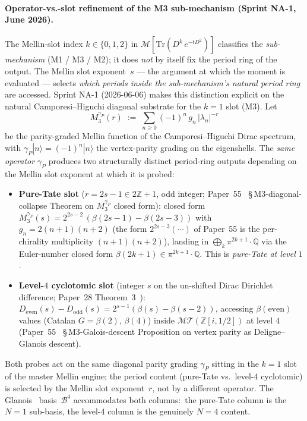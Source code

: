 \documentclass[aps,pra,twocolumn,superscriptaddress,longbibliography]{revtex4-2}
\begin{document}
\paragraph{Operator-vs.-slot refinement of the M3 sub-mechanism
(Sprint NA-1, June 2026).}
The Mellin-slot index $k \in \{0, 1, 2\}$ in
$\mathcal{M}[\mathrm{Tr}(D^k\, e^{-tD^2})]$ classifies the
\emph{sub-mechanism} (M1 / M3 / M2); it does \emph{not} by itself fix
the period ring of the output.  The Mellin slot exponent~$s$ --- the
argument at which the moment is evaluated --- selects \emph{which
periods inside the sub-mechanism's natural period ring} are accessed.
Sprint NA-1 (2026-06-06) makes this distinction explicit on the natural
Camporesi--Higuchi diagonal substrate for the $k = 1$ slot (M3).
Let
\begin{equation}
\label{eq:m3_gammaP_slot}
M_3^{\gamma_P}(r)
   \;:=\; \sum_{n \ge 0} (-1)^n\, g_n\, |\lambda_n|^{-r}
\end{equation}
be the parity-graded Mellin function of the Camporesi--Higuchi Dirac
spectrum, with $\gamma_P|n\rangle = (-1)^n |n\rangle$ the vertex-parity
grading on the eigenshells.  The \emph{same operator} $\gamma_P$
produces two structurally distinct period-ring outputs depending on
the Mellin slot exponent at which it is probed:
\begin{itemize}
  \item \textbf{Pure-Tate slot} ($r = 2s - 1 \in 2\mathbb{Z} + 1$, odd
    integer; Paper~55~\cite{loutey_paper55}
    \S\,M3-diagonal-collapse Theorem on
    $M_3^{\gamma_P}$ closed form):
    closed form
    $M_3^{\gamma_P}(s) = 2^{2s - 2}\,(\beta(2s - 1) - \beta(2s - 3))$
    with $g_n = 2(n+1)(n+2)$ (the form $2^{2s-3}(\cdots)$ of Paper~55 is
    the per-chirality multiplicity $(n+1)(n+2)$),
    landing in $\bigoplus_k \pi^{2k+1}\cdot\mathbb{Q}$ via the
    Euler-number closed form
    $\beta(2k + 1) \in \pi^{2k + 1}\cdot\mathbb{Q}$.  This is
    \emph{pure-Tate at level $1$}.
  \item \textbf{Level-$4$ cyclotomic slot} (integer $s$ on the
    un-shifted Dirac Dirichlet difference; Paper~28
    Theorem~3~\cite{loutey_paper28}):
    $D_{\mathrm{even}}(s) - D_{\mathrm{odd}}(s)
       = 2^{s-1}(\beta(s) - \beta(s-2))$,
    accessing $\beta(\mathrm{even})$ values
    (Catalan $G = \beta(2)$, $\beta(4)$) inside
    $\mathcal{MT}(\mathbb{Z}[i, 1/2])$ at level $4$
    (Paper~55~\cite{loutey_paper55} \S\,M3-Galois-descent
    Proposition on vertex parity as
    Deligne--Glanois descent).
\end{itemize}
Both probes act on the same diagonal parity grading $\gamma_P$
sitting in the $k = 1$ slot of the master Mellin engine; the
period content (pure-Tate vs.\ level-$4$ cyclotomic) is selected
by the Mellin slot exponent~$r$, not by a different operator.  The
Glanois~\cite{glanois2015} basis~$\mathcal{B}^4$ accommodates both
columns:\ the pure-Tate column is the $N = 1$ sub-basis, the
level-$4$ column is the genuinely $N = 4$ content.
\end{document}
